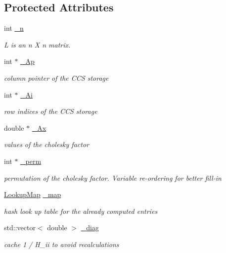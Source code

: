 \subsection*{Protected Attributes}
\begin{DoxyCompactItemize}
\item 
int \mbox{\hyperlink{classg2o_1_1_marginal_covariance_cholesky_a086c541bde9958af88146788a9ac2611}{\+\_\+n}}
\begin{DoxyCompactList}\small\item\em L is an n X n matrix. \end{DoxyCompactList}\item 
int $\ast$ \mbox{\hyperlink{classg2o_1_1_marginal_covariance_cholesky_a5998463e23c716bb1abb02e9b3e40e0b}{\+\_\+\+Ap}}
\begin{DoxyCompactList}\small\item\em column pointer of the C\+CS storage \end{DoxyCompactList}\item 
int $\ast$ \mbox{\hyperlink{classg2o_1_1_marginal_covariance_cholesky_a516fa45fe98edfa0cc68fc2b0e0d5de4}{\+\_\+\+Ai}}
\begin{DoxyCompactList}\small\item\em row indices of the C\+CS storage \end{DoxyCompactList}\item 
double $\ast$ \mbox{\hyperlink{classg2o_1_1_marginal_covariance_cholesky_a2ac05a8c32b6a2e0cdb0b6a071a7552d}{\+\_\+\+Ax}}
\begin{DoxyCompactList}\small\item\em values of the cholesky factor \end{DoxyCompactList}\item 
int $\ast$ \mbox{\hyperlink{classg2o_1_1_marginal_covariance_cholesky_a404f5d0ce82c2877324bafb8997b96aa}{\+\_\+perm}}
\begin{DoxyCompactList}\small\item\em permutation of the cholesky factor. Variable re-\/ordering for better fill-\/in \end{DoxyCompactList}\item 
\mbox{\hyperlink{classg2o_1_1_marginal_covariance_cholesky_a9925dd2e45479a7feb783ff71d93fdbc}{Lookup\+Map}} \mbox{\hyperlink{classg2o_1_1_marginal_covariance_cholesky_a7a9d21e9ee6654b9e6d69a62e87c201a}{\+\_\+map}}
\begin{DoxyCompactList}\small\item\em hash look up table for the already computed entries \end{DoxyCompactList}\item 
std\+::vector$<$ double $>$ \mbox{\hyperlink{classg2o_1_1_marginal_covariance_cholesky_a6ceee33e0cde1d9a4888abab8b6ad712}{\+\_\+diag}}
\begin{DoxyCompactList}\small\item\em cache 1 / H\+\_\+ii to avoid recalculations \end{DoxyCompactList}\end{DoxyCompactItemize}


